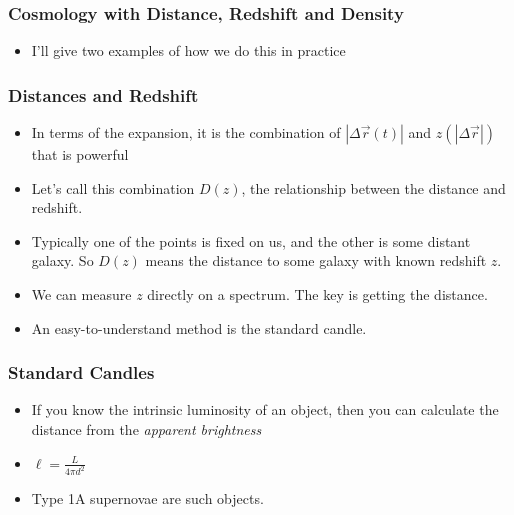 \documentclass{beamer}
\begin{document}
\frame
{

    \frametitle{Cosmology with Distance, Redshift and Density}


    \begin{itemize}

        \item I'll give two examples of how we do this in practice


    \end{itemize}

}



\frame
{

    \frametitle{Distances and Redshift}


    \begin{itemize}

        \item In terms of the expansion, it is the combination of {\color{gold}
            $|\Delta \vec{r} (t)| $ } and {\color{gold} $z(|\Delta \vec{r}|)$}
            that is powerful


        \item Let's call this combination  {\color{gold} $D(z)$}, the relationship
            between the distance and redshift.

        \item Typically one of the points is fixed on us, and the other is
            some distant galaxy. So {\color{gold} $D(z)$} means the distance
            to some galaxy with known redshift $z$.

        \item We can measure $z$ directly on a spectrum.  The key is getting
            the distance.

        \item An easy-to-understand method is the standard candle.

    \end{itemize}

}

\frame
{

    \frametitle{Standard Candles}


    \begin{itemize}

        \item If you know the intrinsic luminosity of an object, then you can
            calculate the distance from the {\em apparent brightness}

        \item {\color{gold} $\ell = \frac{L}{4 \pi d^2}$ }

        \item Type 1A supernovae are such objects.

    \end{itemize}

}
\end{document}
